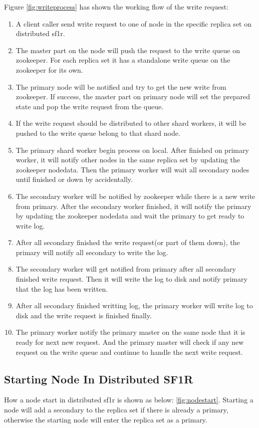 Figure \ref{fig:writeprocess} has shown the working flow of the write request:
\begin{enumerate}
 \item A client caller send write request to one of node in the specific replica set on distributed sf1r.
 \item The master part on the node will push the request to the write queue on zookeeper. For each replica set it has a standalone write queue on the zookeeper for its own.
 \item The primary node will be notified and try to get the new write from zookeeper. If success, the master part on primary node will set the prepared state and pop the write request from the queue.
 \item If the write request should be distributed to other shard workers, it will be pushed to the write queue belong to that shard node.
 \item The primary shard worker begin process on local. After finished on primary worker, it will notify other nodes in the same replica set by updating the zookeeper nodedata. Then the primary worker will wait all secondary nodes until finished or down by accidentally.
 \item The secondary worker will be notified by zookeeper while there is a new write from primary. After the secondary worker finished, it will notify the primary by updating the zookeeper nodedata and wait the primary to get ready to write log.
 \item After all secondary finished the write request(or part of them down), the  primary will notify all secondary to write the log.
 \item The secondary worker will get notified from primary after all secondary finished write request. Then it will write the log to disk and notify primary that the log has been written.
 \item After all secondary finished writting log, the primary worker will write log to disk and the write request is finished finally.
 \item The primary worker notify the primary master on the same node that it is ready for next new request. And the primary master will check if any new request on the write queue and continue to handle the next write request.
\end{enumerate}

\subsection{Starting Node In Distributed SF1R}
How a node start in distributed sf1r is shown as below: \ref{fig:nodestart}. Starting a node will add a secondary to the replica set if there is already a primary, otherwise the starting node will enter the replica set as a primary.

